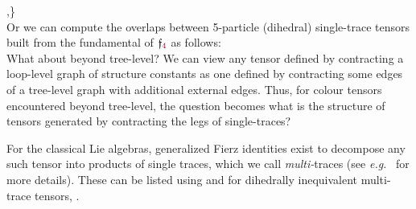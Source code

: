 \documentclass[12pt,a4paper]{article}\let\ifpdf\relax
\begin{document}
{{\phantom{\{}\mbox{}\hspace{-1pt},\hspace{-1pt}\mbox{}\}}
}~\\[-10pt]

Or we can compute the overlaps between 5-particle (dihedral) single-trace tensors built from the fundamental of $\mathfrak{f}_{\r{4}}$ as follows:
%
~\\[-10pt]
%

\newpage
What about beyond tree-level? We can view any tensor defined by contracting a loop-level graph of structure constants as one defined by contracting some edges of a tree-level graph with additional external edges. Thus, for colour tensors encountered beyond tree-level, the question becomes what is the structure of tensors generated by contracting the legs of single-traces?

For the classical Lie algebras, generalized Fierz identities exist to decompose any such tensor into products of single traces, which we call \emph{multi-}traces (see \emph{e.g.}~\cite{Bourjaily:2025hvq} for more details). These can be listed using \mbox{} and for dihedrally inequivalent multi-trace tensors,  \mbox{}. 
\end{document}
